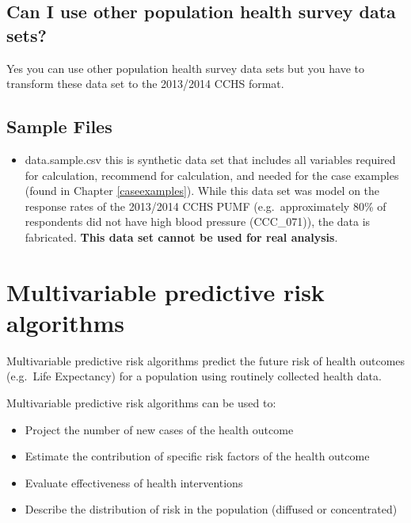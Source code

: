 \documentclass[]{book}
\providecommand{\tightlist}{%
  \setlength{\itemsep}{0pt}\setlength{\parskip}{0pt}}
\begin{document}
\subsection{Can I use other population health survey data
sets?}\label{can-i-use-other-population-health-survey-data-sets}

Yes you can use other population health survey data sets but you have to
transform these data set to the 2013/2014 CCHS format.

\subsection{Sample Files}\label{sample-files}

\begin{itemize}
\tightlist
\item
  data.sample.csv this is synthetic data set that includes all variables
  required for calculation, recommend for calculation, and needed for
  the case examples (found in Chapter \ref{caseexamples}). While this
  data set was model on the response rates of the 2013/2014 CCHS PUMF
  (e.g.~approximately 80\% of respondents did not have high blood
  pressure (CCC\_071)), the data is fabricated. \textbf{This data set
  cannot be used for real analysis}.
\end{itemize}

\section{Multivariable predictive risk
algorithms}\label{multivariable-predictive-risk-algorithms}

Multivariable predictive risk algorithms predict the future risk of
health outcomes (e.g.~Life Expectancy) for a population using routinely
collected health data.

Multivariable predictive risk algorithms can be used to:

\begin{itemize}
\tightlist
\item
  Project the number of new cases of the health outcome
\item
  Estimate the contribution of specific risk factors of the health
  outcome
\item
  Evaluate effectiveness of health interventions
\item
  Describe the distribution of risk in the population (diffused or
  concentrated)
\end{itemize}
\end{document}
